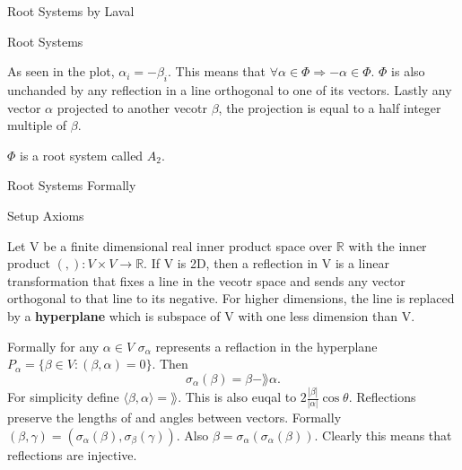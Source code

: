 \documentclass[12pt, letterpaper]{article}
\newcommand{\R}{\mathbb{R}}
\begin{document}
\begin{section}{Root Systems by Laval}
\begin{subsection}{Root Systems}


    As seen in the plot, \(\alpha_{i} = -\beta_{i}\). This means that
    \(\forall \alpha \in \Phi \Rightarrow -\alpha \in \Phi\). \(\Phi\) is also
    unchanded by any reflection in a line orthogonal to one of its vectors.
    Lastly any vector \(\alpha\) projected to another vecotr \(\beta\), the
    projection is equal to a half integer multiple of \(\beta\).

    \(\Phi\) is a root system called \(A_{2}\).

  \end{subsection}

  \begin{subsection}{Root Systems Formally}

    \begin{subsubsection}{Setup Axioms}

      Let V be a finite dimensional real inner product space over \(\R\) with
      the inner product \((,) : V \times V \to \R\). If V is 2D, then a
      reflection in V is a linear transformation that fixes a line in the
      vecotr space and sends any vector orthogonal to that line to its
      negative. For higher dimensions, the line is replaced by a
      \textbf{hyperplane} which is subspace of V with one less dimension than V.

      Formally for any \(\alpha \in V\) \(\sigma_{\alpha}\) represents a
      reflaction in the hyperplane
      \(P_{\alpha} = \{\beta \in V : (\beta, \alpha) = 0\}\). Then
      \[\sigma_{\alpha}(\beta) = \beta - \rang \alpha.\]
      For simplicity define \(\langle \beta, \alpha \rangle = \rang\). This is
      also euqal to \(2 \frac{|\beta|}{|\alpha|} \cos \theta\).
      Reflections preserve the lengths of and angles between vectors. Formally
      \((\beta, \gamma) = (\sigma_{\alpha}(\beta), \sigma_{\beta}(\gamma))\).
      Also \(\beta = \sigma_{\alpha}(\sigma_{\alpha}(\beta))\). Clearly this
      means that reflections are injective.


\end{subsubsection}
\end{subsection}
\end{section}
\end{document}
